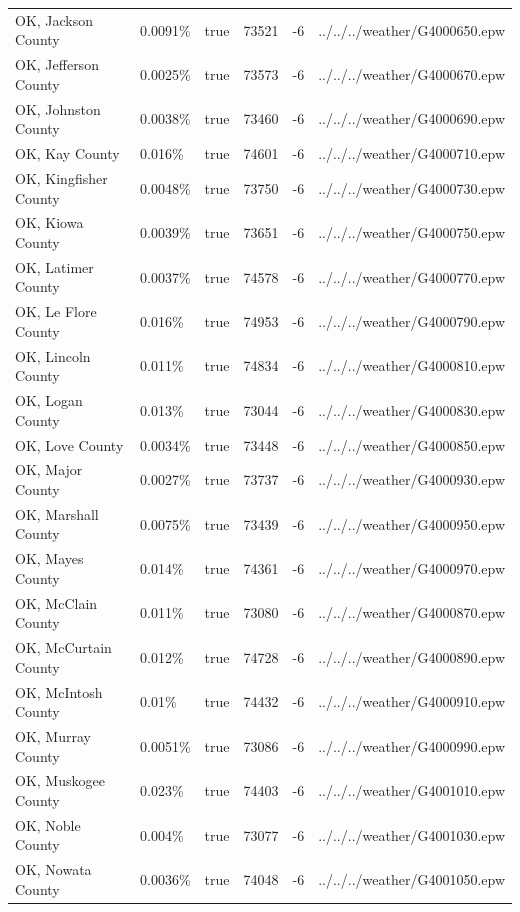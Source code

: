 \begin{longtable}[]{@{}llllll@{}}
OK, Jackson County & 0.0091\% & true & 73521 & -6 &
../../../weather/G4000650.epw \\
OK, Jefferson County & 0.0025\% & true & 73573 & -6 &
../../../weather/G4000670.epw \\
OK, Johnston County & 0.0038\% & true & 73460 & -6 &
../../../weather/G4000690.epw \\
OK, Kay County & 0.016\% & true & 74601 & -6 &
../../../weather/G4000710.epw \\
OK, Kingfisher County & 0.0048\% & true & 73750 & -6 &
../../../weather/G4000730.epw \\
OK, Kiowa County & 0.0039\% & true & 73651 & -6 &
../../../weather/G4000750.epw \\
OK, Latimer County & 0.0037\% & true & 74578 & -6 &
../../../weather/G4000770.epw \\
OK, Le Flore County & 0.016\% & true & 74953 & -6 &
../../../weather/G4000790.epw \\
OK, Lincoln County & 0.011\% & true & 74834 & -6 &
../../../weather/G4000810.epw \\
OK, Logan County & 0.013\% & true & 73044 & -6 &
../../../weather/G4000830.epw \\
OK, Love County & 0.0034\% & true & 73448 & -6 &
../../../weather/G4000850.epw \\
OK, Major County & 0.0027\% & true & 73737 & -6 &
../../../weather/G4000930.epw \\
OK, Marshall County & 0.0075\% & true & 73439 & -6 &
../../../weather/G4000950.epw \\
OK, Mayes County & 0.014\% & true & 74361 & -6 &
../../../weather/G4000970.epw \\
OK, McClain County & 0.011\% & true & 73080 & -6 &
../../../weather/G4000870.epw \\
OK, McCurtain County & 0.012\% & true & 74728 & -6 &
../../../weather/G4000890.epw \\
OK, McIntosh County & 0.01\% & true & 74432 & -6 &
../../../weather/G4000910.epw \\
OK, Murray County & 0.0051\% & true & 73086 & -6 &
../../../weather/G4000990.epw \\
OK, Muskogee County & 0.023\% & true & 74403 & -6 &
../../../weather/G4001010.epw \\
OK, Noble County & 0.004\% & true & 73077 & -6 &
../../../weather/G4001030.epw \\
OK, Nowata County & 0.0036\% & true & 74048 & -6 &
../../../weather/G4001050.epw \\

\end{longtable}
